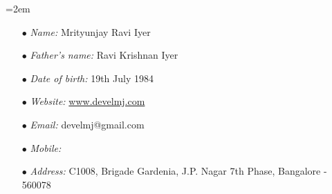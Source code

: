 \documentclass{scrartcl}
\newcommand{\Description}[1]{\hangindent=2em\hangafter=0\noindent\raggedright\footnotesize{#1}\par\normalsize}
\begin{document}
\begin{cv}{
\href{http://www.develmj.com}{}
}
\vspace{1em}

\noindent{}
\vspace{0.5em}

\Description{
\begin{itemize}
  \item[\footnotesize$\bullet$] \textsl{Name:} Mrityunjay Ravi Iyer
  \item[\footnotesize$\bullet$] \textsl{Father's name:} Ravi Krishnan Iyer
  \item[\footnotesize$\bullet$] \textsl{Date of birth:} 19th July 1984
  \item[\footnotesize$\bullet$] \textsl{Website:}
    \url{www.develmj.com}
  \item[\footnotesize$\bullet$] \textsl{Email:} develmj@gmail.com
  \item[\footnotesize$\bullet$] \textsl{Mobile:} 
  \item[\footnotesize$\bullet$] \textsl{Address:} C1008, Brigade
    Gardenia, J.P. Nagar 7th Phase, Bangalore - 560078
\end{itemize}
}
\end{cv}
\end{document}
